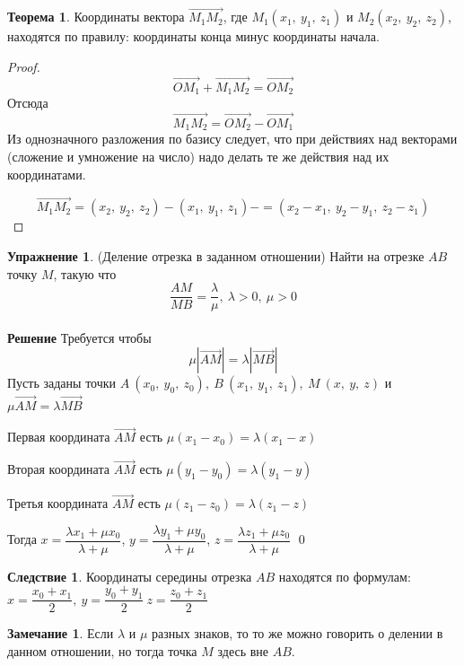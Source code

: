 \documentclass{article}
\theoremstyle{definition}
\newtheorem{exercise}{Упражнение}
\newtheorem{theorem}{Теорема}[section]
\newtheorem{remark}{Замечание}
\newtheorem*{corollary}{Следствие}
\newenvironment{solution}[1]{\textbf{\\ Решение #1}}{\qed}
\begin{document}
\begin{theorem}
Координаты вектора $\overrightarrow{M_1 M_2}$, где $M_1 (x_1,\ y_1,\ z_1)$ и $M_2 (x_2,\ y_2,\ z_2)$, находятся по правилу: координаты конца минус координаты начала.
\begin{proof}
$$\overrightarrow{OM_1} + \overrightarrow{M_1M_2} = \overrightarrow{OM_2}$$
Отсюда
$$\overrightarrow{M_1M_2} = \overrightarrow{OM_2} - \overrightarrow{OM_1}$$
Из однозначного разложения по базису следует, что при действиях над векторами (сложение и умножение на число) надо делать те же действия над их координатами.

$$\overrightarrow{M_1M_2} = (x_2,\ y_2,\ z_2) - (x_1,\ y_1,\ z_1) - = (x_2-x_1,\ y_2-y_1,\ z_2-z_1)$$
\end{proof}
\end{theorem}

\begin{exercise}{(Деление отрезка в заданном отношении)}
\newline
Найти на отрезке $AB$ точку $M$, такую что $$\dfrac{AM}{MB} = \dfrac{\lambda}{\mu},\ \lambda > 0,\ \mu>0$$
\begin{solution}{}
Требуется чтобы
$$\mu|\overrightarrow{AM}| = \lambda|\overrightarrow{MB}|$$
Пусть заданы точки $A\ (x_0,\ y_0,\ z_0),\ B\ (x_1,\ y_1,\ z_1),\ M\ (x,\ y,\ z)$ и $\mu\overrightarrow{AM} = \lambda\overrightarrow{MB}$

Первая координата $\overrightarrow{AM}$ есть $\mu(x_1-x_0) = \lambda(x_1-x)$

Вторая координата $\overrightarrow{AM}$ есть $\mu(y_1-y_0) = \lambda(y_1-y)$

Третья координата $\overrightarrow{AM}$ есть $\mu(z_1-z_0) = \lambda(z_1-z)$

Тогда
$x = \dfrac{\lambda x_1 + \mu x_0}{\lambda + \mu}$,
$y = \dfrac{\lambda y_1 + \mu y_0}{\lambda + \mu}$,
$z = \dfrac{\lambda z_1 + \mu z_0}{\lambda + \mu}$
\end{solution}
\end{exercise}

\begin{corollary}
Координаты середины отрезка $AB$ находятся по формулам:
$x = \dfrac{x_0+x_1}{2},\ y = \dfrac{y_0+y_1}{2}\ z = \dfrac{z_0+z_1}{2}$
\end{corollary}

\begin{remark}
Если $\lambda$ и $\mu$ разных знаков, то то же можно говорить о делении в данном отношении, но тогда точка $M$ здесь вне $AB$.
\end{remark}
\end{document}
